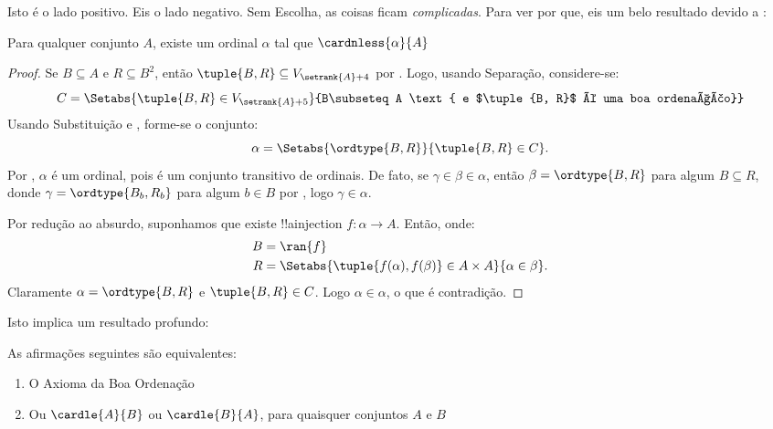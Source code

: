 \documentclass[../../../include/open-logic-section]{subfiles}
\begin{document}

Isto é o lado positivo. Eis o lado negativo. Sem Escolha, as coisas
ficam \emph{complicadas}. Para ver por que, eis um belo resultado devido a
\cite{Hartogs1915}:

\begin{lem}[\emph{em $\ZF$}]
Para qualquer conjunto $A$, existe um ordinal $\alpha$ tal que $\cardnless{\alpha}{A}$
\end{lem}

\begin{proof}
Se $B \subseteq A$ e $R \subseteq B^2$, então $\tuple{B, R} \subseteq
V_{\setrank{A}+4}$ por
. Logo, usando
Separação, considere-se:
\[
	C = \Setabs{\tuple{B, R} \in V_{\setrank{A}+5}}{B\subseteq A 
	\text{ e $\tuple{B, R}$ é uma boa ordenação}}
\]
Usando Substituição e
, forme-se o conjunto: 
\[
	\alpha = \Setabs{\ordtype{B, R}}{\tuple{B, R} \in C}.
\]
Por , $\alpha$ é um
ordinal, pois é um conjunto transitivo de ordinais. De fato, se
$\gamma \in \beta \in \alpha$, então $\beta = \ordtype{B, R}$ para algum
$B \subseteq R$, donde $\gamma = \ordtype{B_b, R_b}$ para algum $b
\in B$ por , logo
$\gamma \in \alpha$. 

Por redução ao absurdo, suponhamos que existe !!a{injection} $f \colon \alpha \to A$.
Então, onde:
\begin{align*}
	B &= \ran{f}\\
	R &= \Setabs{\tuple{f(\alpha), f(\beta)} \in A \times A}{\alpha \in \beta}.
\end{align*}
Claramente $\alpha = \ordtype{B, R}$ e $\tuple{B, R} \in C$. Logo $\alpha
\in \alpha$, o que é contradição.
\end{proof}

Isto implica um resultado profundo:

\begin{thm}[\emph{em $\ZF$}]
As afirmações seguintes são equivalentes:
\begin{enumerate}
	\item{} O Axioma da Boa Ordenação
	\item{} Ou $\cardle{A}{B}$ ou
	$\cardle{B}{A}$, para quaisquer conjuntos $A$ e $B$
\end{enumerate}
\end{thm}
\end{document}
